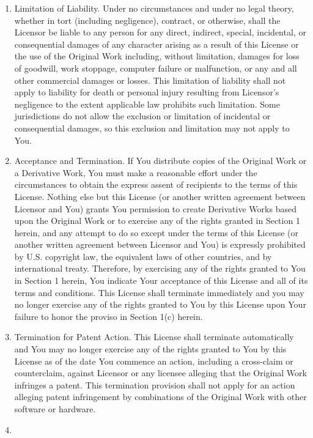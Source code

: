\documentclass[11pt]{book}
\begin{document}
\begin{enumerate}[1)]
part of this License. No license to Original Work is granted hereunder
except under this disclaimer.
\item
Limitation of Liability. Under no circumstances and under no legal
theory, whether in tort (including negligence), contract, or
otherwise, shall the Licensor be liable to any person for any direct,
indirect, special, incidental, or consequential damages of any
character arising as a result of this License or the use of the
Original Work including, without limitation, damages for loss of
goodwill, work stoppage, computer failure or malfunction, or any and
all other commercial damages or losses. This limitation of liability
shall not apply to liability for death or personal injury resulting
from Licensor's negligence to the extent applicable law prohibits such
limitation. Some jurisdictions do not allow the exclusion or
limitation of incidental or consequential damages, so this exclusion
and limitation may not apply to You.
\item
Acceptance and Termination. If You distribute copies of the Original
Work or a Derivative Work, You must make a reasonable effort under the
circumstances to obtain the express assent of recipients to the terms
of this License. Nothing else but this License (or another written
agreement between Licensor and You) grants You permission to create
Derivative Works based upon the Original Work or to exercise any of
the rights granted in Section 1 herein, and any attempt to do so
except under the terms of this License (or another written agreement
between Licensor and You) is expressly prohibited by U.S. copyright
law, the equivalent laws of other countries, and by international
treaty. Therefore, by exercising any of the rights granted to You in
Section 1 herein, You indicate Your acceptance of this License and all
of its terms and conditions. This License shall terminate immediately
and you may no longer exercise any of the rights granted to You by
this License upon Your failure to honor the proviso in Section 1(c)
herein.
\item
Termination for Patent Action. This License shall terminate
automatically and You may no longer exercise any of the rights granted
to You by this License as of the date You commence an action,
including a cross-claim or counterclaim, against Licensor or any
licensee alleging that the Original Work infringes a patent. This
termination provision shall not apply for an action alleging patent
infringement by combinations of the Original Work with other software
or hardware.
\item

\end{enumerate}
\end{document}
